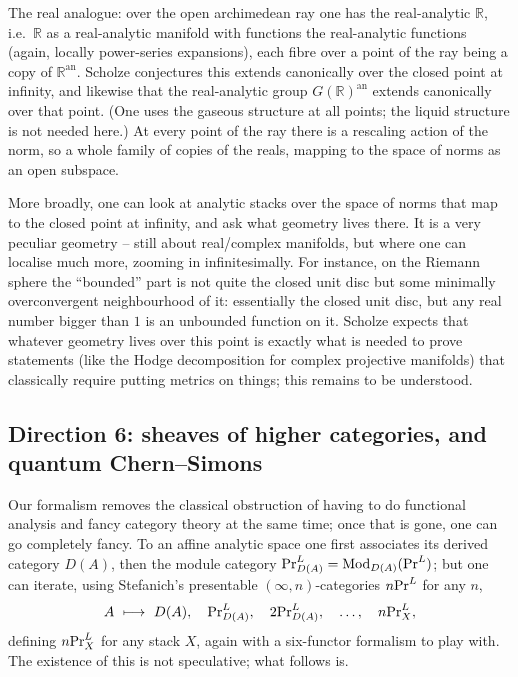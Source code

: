 The real analogue: over the open archimedean ray one has the real-analytic
$\mathbb R$, i.e.\ $\mathbb R$ as a real-analytic manifold with functions the
real-analytic functions (again, locally power-series expansions), each fibre over
a point of the ray being a copy of $\mathbb R^{\mathrm{an}}$. Scholze conjectures
this extends canonically over the closed point at infinity, and likewise that the
real-analytic group $G(\mathbb R)^{\mathrm{an}}$ extends canonically over that
point. (One uses the gaseous structure at all points; the liquid structure is not
needed here.) At every point of the ray there is a rescaling action of the norm,
so a whole family of copies of the reals, mapping to the space of norms as an open
subspace.

\begin{remark}
\label{rmk:24:geometry-at-infinity}
More broadly, one can look at analytic stacks over the space of norms that map to
the closed point at infinity, and ask what geometry lives there. It is a very
peculiar geometry -- still about real/complex manifolds, but where one can
localise much more, zooming in infinitesimally. For instance, on the Riemann
sphere the ``bounded'' part is not quite the closed unit disc but some minimally
overconvergent neighbourhood of it: essentially the closed unit disc, but any
real number bigger than $1$ is an unbounded function on it. Scholze expects that
whatever geometry lives over this point is exactly what is needed to prove
statements (like the Hodge decomposition for complex projective manifolds) that
classically require putting metrics on things; this remains to be understood.
\end{remark}

\subsection{Direction 6: sheaves of higher categories, and quantum
Chern--Simons}
\label{subsec:24:higher-cats}

Our formalism removes the classical obstruction of having to do functional
analysis and fancy category theory at the same time; once that is gone, one can
go completely fancy. To an affine analytic space one first associates its derived
category $D(A)$, then the module category $\mathrm{Pr}^{L}_{D(A)}=\operatorname{Mod}_{D(A)}(\mathrm{Pr}^{L})$; but
one can iterate, using Stefanich's presentable $(\infty,n)$-categories
$n\mathrm{Pr}^{L}$ for any $n$,
\begin{equation*}
A\ \longmapsto\ D(A),\quad \mathrm{Pr}^{L}_{D(A)},\quad 2\mathrm{Pr}^{L}_{D(A)},\quad \dots,\quad
n\mathrm{Pr}^{L}_X ,
\end{equation*}
defining $n\mathrm{Pr}^{L}_X$ for any stack $X$, again with a six-functor formalism to play
with. The existence of this is not speculative; what follows is.

